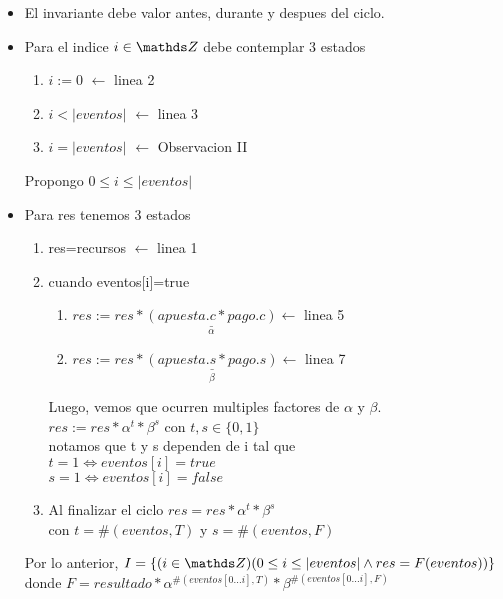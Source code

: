 \documentclass[../../document.tex]{subfiles}
\begin{document}
\begin{itemize}
    \item El invariante debe valor antes, durante y despues del ciclo.
    \item Para el indice {\color{BlueViolet}$i\in \ent$ debe contemplar 3 estados}
    \begin{enumerate}
        \item $i:=0$ \hfill{\color{BlueViolet}$\longleftarrow$ linea 2}
        \item $i<|eventos|$ \hfill{\color{BlueViolet}$\longleftarrow$ linea 3}
        \item $i=|eventos|$ \hfill{\color{BlueViolet}$\longleftarrow$ Observacion II}
    \end{enumerate}
    Propongo $0\leq i\leq |eventos|$
    \item Para res tenemos 3 estados
        \begin{enumerate}
            \item res=recursos \hfill{\color{BlueViolet}$\longleftarrow$ linea 1}
            \item cuando eventos[i]=true
            \begin{enumerate}
                \item $res:=res*\underset{\alpha}{\underline{(apuesta.c*pago.c)}}$\hfill{\color{BlueViolet}$\longleftarrow$ linea 5}
                \item $res:=res*\underset{\beta}{\underline{(apuesta.s*pago.s)}}$\hfill{\color{BlueViolet}$\longleftarrow$ linea 7}
            \end{enumerate}
            Luego, vemos que ocurren multiples factores de $\alpha$ y $\beta$.
            \\$res:=res*\alpha^t*\beta^s$ con $t,s\in\{0,1\}$
            \\notamos que t y s dependen de i tal que 
            \\$t=1 \iff eventos[i]=true$
            \\$s=1 \iff eventos[i]=false$
            \item Al finalizar el ciclo $res=res*\alpha^t*\beta^s$
            \\con $t=\#(eventos,T)$ y $s=\#(eventos, F)$
        \end{enumerate}
        Por lo anterior, $I=\{(i\in \ent)(0\leq i \leq |eventos| \land res=F(eventos))\}$
        \\donde $F=resultado*\alpha^{\#(eventos[0...i],T)}*\beta^{\#(eventos[0...i],F)}$
\end{itemize}
\end{document}
